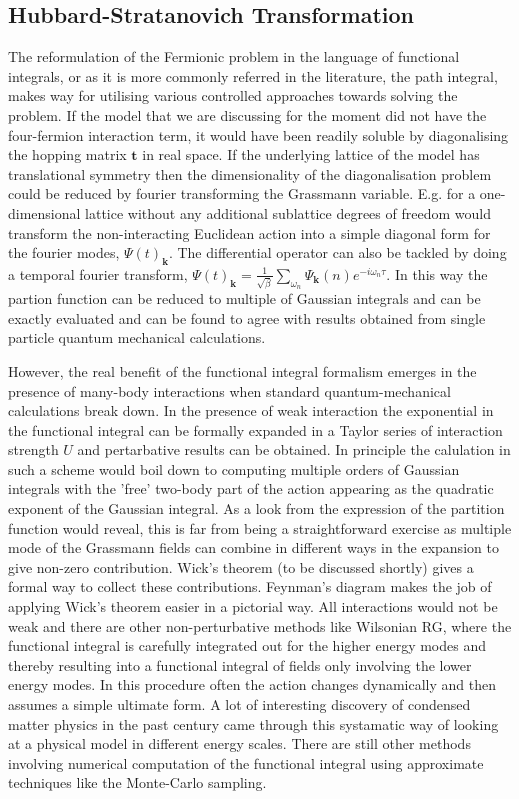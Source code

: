 \documentclass[notitlepage,onecolumn,showpacs,11pt]{revtex4-1}
\begin{document}
\subsection{Hubbard-Stratanovich Transformation}

The reformulation of the Fermionic problem in the language of functional integrals, or as it is more commonly referred
in the literature, the path integral, makes way for utilising various controlled approaches towards solving the problem. 
If the model that we are discussing for the moment did not have the four-fermion interaction term, it would have been 
readily soluble by diagonalising the hopping matrix $ \bm{t} $ in real space. If the underlying lattice of the model 
has translational symmetry then the dimensionality of the diagonalisation problem could be reduced by fourier transforming
the Grassmann variable. E.g. for a one-dimensional lattice without any additional sublattice degrees of freedom would 
transform the non-interacting Euclidean action into a simple diagonal form for the fourier modes, $ \Psi(t)_{\bm{k}} $. The 
differential operator can also be tackled by doing a temporal fourier transform, 
$ \Psi(t)_{\bm{k}}=\frac{1}{\sqrt{\beta}}\sum_{\omega_n}\Psi_{\bm{k}}(n)e^{-i\omega_n\tau}$. 
In this way the partion function can be reduced to multiple of Gaussian
integrals and can be exactly evaluated and can be found to agree  with results obtained from single particle quantum 
mechanical calculations.

However, the real benefit of the functional integral formalism emerges in the presence of many-body interactions when 
standard quantum-mechanical calculations break down. In the presence of weak interaction the exponential in the functional 
integral can be formally expanded in a Taylor series of interaction strength $ U $ and pertarbative results can be obtained. 
In principle the calulation in such a scheme would boil down to computing multiple orders of Gaussian integrals with the 
'free' two-body part of the action appearing as the quadratic exponent of the Gaussian integral. As a look from the expression
of the partition function would reveal, this is far from being a straightforward exercise as multiple mode of the 
Grassmann fields can combine in different ways in the expansion to give non-zero contribution. Wick's theorem (to be discussed
shortly) gives a formal way to collect these contributions. Feynman's diagram makes the job of applying Wick's theorem 
easier in a pictorial way. All interactions would not be weak and there are other non-perturbative methods like Wilsonian RG, where
the functional integral is carefully integrated out for the higher energy modes and thereby resulting into a functional 
integral of fields only involving the lower energy modes. In this procedure often the action changes dynamically and then 
assumes a simple ultimate form. A lot of interesting discovery of condensed matter physics in the past century came through 
this systamatic way of looking at a physical model in different energy scales. There are still other methods involving numerical 
computation of the functional integral using approximate techniques like the Monte-Carlo sampling. 
\end{document}
